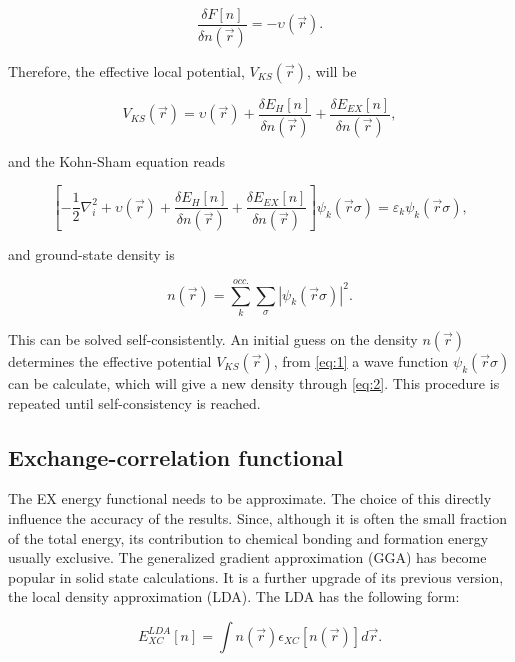 \begin{equation}
\frac{\delta F[n]}{\delta n(\vec{r})}=-\upsilon(\vec{r}).
\end{equation}

Therefore, the effective local potential, $V_{KS}(\vec{r})$, will be

\begin{equation}
V_{KS}(\vec{r})=\upsilon(\vec{r})+\frac{\delta E_H[n]}{\delta n(\vec{r})}+\frac{\delta E_{EX}[n]}{\delta n(\vec{r})},
\end{equation}

and the Kohn-Sham equation reads

\begin{equation}\label{eq:1}
\left[ -\frac{1}{2}\nabla_i^2+\upsilon(\vec{r})+\frac{\delta E_H[n]}{\delta n(\vec{r})}+\frac{\delta E_{EX}[n]}{\delta n(\vec{r})}\right]\mathit{\psi}_k(\vec{r}\sigma)=\varepsilon_k\mathit{\psi}_k(\vec{r}\sigma),
\end{equation}

and ground-state density is 

\begin{equation}\label{eq:2}
n(\vec{r})=\sum_k^{occ.}\sum_\sigma|\mathit{\psi}_k(\vec{r}\sigma)|^2.
\end{equation}

This can be solved self-consistently. An initial guess on the density $n(\vec{r})$ determines the effective potential $V_{KS}(\vec{r})$, from \eqref{eq:1} a wave function $\mathit{\psi}_k(\vec{r}\sigma)$ can be calculate, which will give a new density through \eqref{eq:2}. This procedure is repeated until self-consistency is reached. 

\subsection{Exchange-correlation functional}

The EX energy functional needs to be approximate. The choice of this directly influence the accuracy of the results. Since, although it is often the small fraction of the total energy, its contribution to chemical bonding and formation energy usually exclusive. The generalized gradient approximation (GGA) has become popular in solid state calculations. It is a further upgrade of its previous version, the local density approximation (LDA). The LDA has the following form:

\begin{equation}
E_{XC}^{LDA}[n]=\int n(\vec{r})\epsilon_{XC}[n(\vec{r})]d\vec{r}.
\end{equation}

